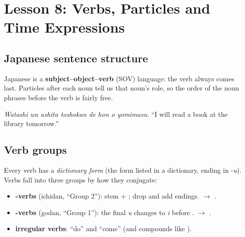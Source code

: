 \chapter{Lesson 8: Verbs, Particles and Time Expressions}

\section{Japanese sentence structure}

Japanese is a \textbf{subject--object--verb} (SOV) language: the verb always comes last.
Particles after each noun tell us that noun's role, so the order of the noun phrases
before the verb is fairly free.

\begin{center}
\end{center}
\emph{Watashi wa ashita toshokan de hon o yomimasu.}
``I will read a book at the library tomorrow.''

\section{Verb groups}

Every verb has a \emph{dictionary form} (the form listed in a dictionary, ending in
-\emph{u}). Verbs fall into three groups by how they conjugate:
\begin{itemize}
  \item \textbf{-verbs} (ichidan, ``Group 2''): stem + ; drop  and add
        endings.  $\to$ .
  \item \textbf{-verbs} (godan, ``Group 1''): the final \emph{u} changes to
        \emph{i} before .  $\to$ .
  \item \textbf{irregular verbs}:  ``do'' and  ``come'' (and compounds
        like ).
\end{itemize}

